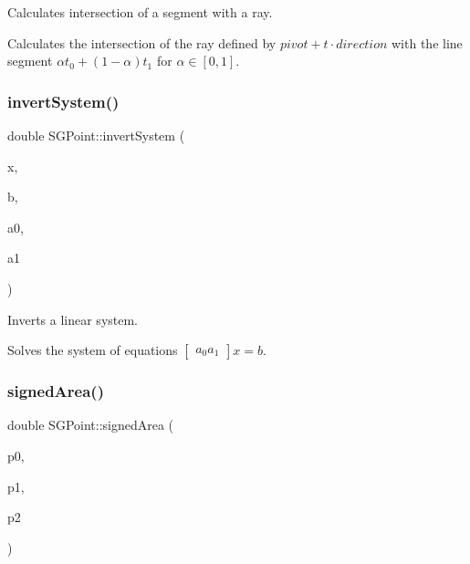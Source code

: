 Calculates intersection of a segment with a ray. 

Calculates the intersection of the ray defined by $pivot+t\cdot{}direction$ with the line segment $\alpha{}t_0+(1-\alpha)t_1$ for $\alpha\in[0,1]$. \mbox{\label{classSGPoint_a0a613c9498f11a7d2d50c4f7f371dab9}} 
\subsubsection{\texorpdfstring{invert\+System()}{invertSystem()}}
{\footnotesize\ttfamily double S\+G\+Point\+::invert\+System (\begin{DoxyParamCaption}\item[{\hyperlink{classSGPoint}{S\+G\+Point} \&}]{x,  }\item[{const \hyperlink{classSGPoint}{S\+G\+Point} \&}]{b,  }\item[{const \hyperlink{classSGPoint}{S\+G\+Point} \&}]{a0,  }\item[{const \hyperlink{classSGPoint}{S\+G\+Point} \&}]{a1 }\end{DoxyParamCaption})\hspace{0.3cm}{\ttfamily [static]}}



Inverts a linear system. 

Solves the system of equations $\left[\begin{array}{c}{a_0}{a_1}\end{array}\right]x=b$. \mbox{\label{classSGPoint_a24a3cc80a532ee6b5c85713b69153311}} 
\subsubsection{\texorpdfstring{signed\+Area()}{signedArea()}}
{\footnotesize\ttfamily double S\+G\+Point\+::signed\+Area (\begin{DoxyParamCaption}\item[{const \hyperlink{classSGPoint}{S\+G\+Point} \&}]{p0,  }\item[{const \hyperlink{classSGPoint}{S\+G\+Point} \&}]{p1,  }\item[{const \hyperlink{classSGPoint}{S\+G\+Point} \&}]{p2 }\end{DoxyParamCaption})\hspace{0.3cm}{\ttfamily [static]}}



